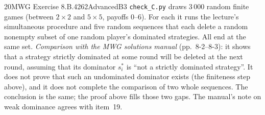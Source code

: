 \begin{exsol}{20}{MWG Exercise 8.B.4}{262}{Advanced}{B3}
\verify \texttt{check\_C.py} draws 3\,000 random finite games (between $2\times2$ and $5\times5$,
payoffs $0$--$6$). For each it runs the lecture's simultaneous procedure and five random
sequences that each delete a random nonempty subset of one random player's dominated
strategies. All end at the same set. \emph{Comparison with the MWG solutions manual}
(pp.~8-2--8-3): it shows that a strategy strictly dominated at some round will be deleted at the
next round, assuming that its dominator $s_i^*$ is ``not a strictly dominated strategy''. It does
not prove that such an undominated dominator exists (the finiteness step above), and it does not
complete the comparison of two whole sequences. The conclusion is the same; the proof above
fills those two gaps. The manual's note on weak dominance agrees with item~19.

\end{exsol}
